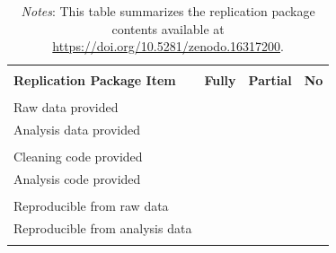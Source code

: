 \documentclass[12pt,a4paper]{article}
\begin{document}
\begin{table}[ht!]
\centering
\caption{Replication Package Contents and Reproducibility}
\label{tab:reppkg_table}
\footnotesize 
	\begin{tabular}{lccc}
	\hline \hline
	\\
	\textbf{Replication Package Item} 	& \textbf{Fully} & \textbf{Partial} & \textbf{No} \\
	\hline
	\\
	Raw data provided                 	& \checkmark &  &  \\ 
	Analysis data provided				& \checkmark &  &  \\ 
	\\
	Cleaning code provided				& \checkmark&  &  \\ 
	Analysis code provided				& \checkmark &  & \\ 
	\\
	Reproducible from raw data			&  \checkmark&  &  \\ 
	Reproducible from analysis data		& \checkmark &  &  \\ 
	\\
	\hline \hline
	\end{tabular}
\caption*{
\footnotesize \emph{Notes}: This table summarizes the replication package contents available at \url{https://doi.org/10.5281/zenodo.16317200}. 
}
\end{table}


\begin{table}[ht!]\scriptsize\centering

\caption{Spectator demographics and balances by treatment (Luck, Merit, Random-Education, and Random-Employment). This replicates DHL Table~2 using the cleaned replication sample.}
\label{tab:balance_main}
\end{table}

\begin{table}\scriptsize\centering

\caption{Structural estimates of the curvature parameter $\alpha$ of the spectators' loss function, following DHL Table~3 (their Section~3.2.2) and re-estimated on our adjusted sample. As in DHL's code, $\alpha$ is estimated for meritocratic spectators by maximum likelihood with Stata's non-linear mixed-effects command \texttt{menl}, separately for each task. The three columns correspond to the Vary-Probability, Vary-Education, and Vary-Employment tasks.}
\label{tab:table3}
\end{table}
\end{document}
